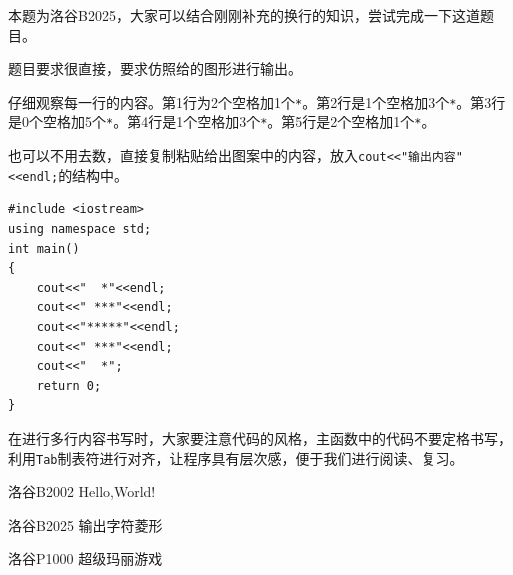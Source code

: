 本题为洛谷B2025，大家可以结合刚刚补充的换行的知识，尝试完成一下这道题目。
\begin{tmfx}
题目要求很直接，要求仿照给的图形进行输出。

仔细观察每一行的内容。第1行为2个空格加1个\texttt{*}。第2行是1个空格加3个\texttt{*}。第3行是0个空格加5个\texttt{*}。第4行是1个空格加3个\texttt{*}。第5行是2个空格加1个\texttt{*}。

也可以不用去数，直接复制粘贴给出图案中的内容，放入\texttt{cout<<"输出内容"<<endl;}的结构中。
\end{tmfx}
\begin{dmsx}
\begin{verbatim}
#include <iostream>
using namespace std;
int main()
{
	cout<<"  *"<<endl;
	cout<<" ***"<<endl;
	cout<<"*****"<<endl;
	cout<<" ***"<<endl;
	cout<<"  *";
	return 0;
}
\end{verbatim}
\end{dmsx}
在进行多行内容书写时，大家要注意代码的风格，主函数中的代码不要定格书写，利用\texttt{Tab}制表符进行对齐，让程序具有层次感，便于我们进行阅读、复习。
\begin{problemset}
\item 洛谷B2002 Hello,World!
\item 洛谷B2025 输出字符菱形
\item 洛谷P1000 超级玛丽游戏
\end{problemset}



